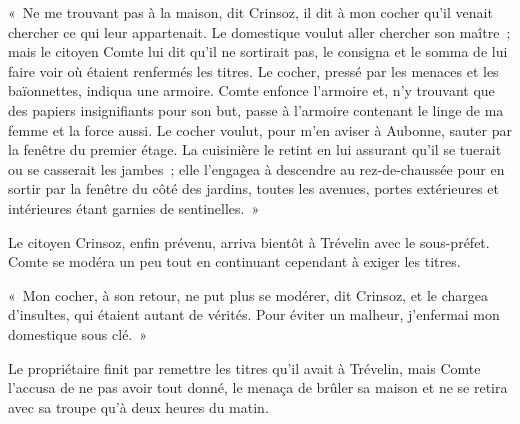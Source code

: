 \documentclass[french,twoside]{book} %
\newenvironment{quoteblock}%
  {\begin{quoting}}
  {\end{quoting}}
\newenvironment{quotebar}{%
    \def\FrameCommand{{\color{rubric!10!}\vrule width 0.5em} \hspace{0.9em}}%
    \def\OuterFrameSep{\itemsep} %
    \MakeFramed {\advance\hsize-\width \FrameRestore}
  }%
  {%
    \endMakeFramed
  }
\renewenvironment{quoteblock}%
  {%
    \savenotes
    \setstretch{0.9}
    \normalfont
    \begin{quotebar}
  }
  {%
    \end{quotebar}
    \spewnotes
  }
\begin{document}
\begin{quoteblock}
 \noindent « Ne me trouvant pas à la maison, dit Crinsoz, il dit à mon cocher qu’il venait chercher ce qui leur appartenait. Le domestique voulut aller chercher son maître ; mais le citoyen Comte lui dit qu’il ne sortirait pas, le consigna et le somma de lui faire voir où étaient renfermés les titres. Le cocher, pressé par les menaces et les baïonnettes, indiqua une armoire. Comte enfonce l’armoire et, n’y trouvant que des papiers insignifiants pour son but, passe à l’armoire contenant le linge de ma femme et la force aussi. Le cocher voulut, pour m’en aviser à Aubonne, sauter par la fenêtre du premier étage. La cuisinière le retint en lui assurant qu’il se tuerait ou se casserait les jambes ; elle l’engagea à descendre au rez-de-chaussée pour en sortir par la fenêtre du côté des jardins, toutes les avenues, portes extérieures et intérieures étant garnies de sentinelles. »
 \end{quoteblock}

\noindent Le citoyen Crinsoz, enfin prévenu, arriva bientôt à Trévelin avec le sous-préfet. Comte se modéra un peu tout en continuant cependant à exiger les titres.\par

\begin{quoteblock}
\noindent « Mon cocher, à son retour, ne put plus se modérer, dit Crinsoz, et le chargea d’insultes, qui étaient autant de vérités. Pour éviter un malheur, j’enfermai mon domestique sous clé. »\end{quoteblock}

\noindent Le propriétaire finit par remettre les titres qu’il avait à Trévelin, mais Comte l’accusa de ne pas avoir tout donné, le menaça de brûler sa maison et ne se retira avec sa troupe qu’à deux heures du matin.
\end{document}
